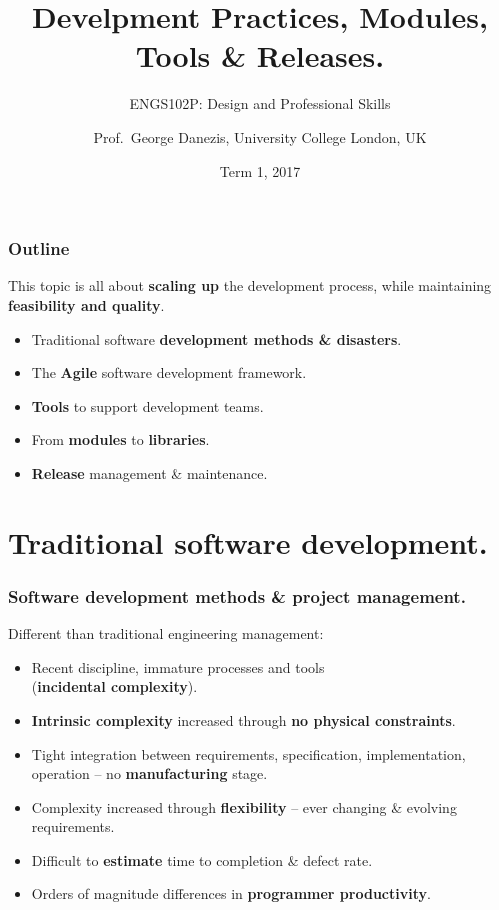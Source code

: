 \documentclass{beamer} %
\author{Prof.\ George Danezis, University College London, UK}
\title{Develpment Practices, Modules, Tools \& Releases.}
\subtitle{ENGS102P: Design and Professional Skills }
\date{Term 1, 2017}
\newcommand\emc[1]{\textcolor{brightblue}{\textbf{#1}}}
\begin{document}
\nobibliography*


\frame{
\titlepage
}

\begin{frame}
\frametitle{Outline}

This topic is all about \emc{scaling up} the development process, while maintaining \emc{feasibility and quality}.

\begin{itemize}
  \item Traditional software \emc{development methods \& disasters}.
  \item The \emc{Agile} software development framework.
  \item \emc{Tools} to support development teams.
  \item From \emc{modules} to \emc{libraries}.
  \item \emc{Release} management \& maintenance.
\end{itemize}

\end{frame}

\section{Traditional software development.}

\begin{frame}
\frametitle{Software development methods \& project management.}

Different than traditional engineering management:
\begin{itemize}
  \item Recent discipline, immature processes and tools \\ (\emc{incidental complexity}).
  \item \emc{Intrinsic complexity} increased through \emc{no physical constraints}.
  \item Tight integration between requirements, specification, implementation, operation -- no \emc{manufacturing} stage.
  \item Complexity increased through \emc{flexibility} -- ever changing \& evolving requirements.
  \item Difficult to \emc{estimate} time to completion \& defect rate.
  \item Orders of magnitude differences in \emc{programmer productivity}.
\end{itemize}

\end{frame}
\end{document}
